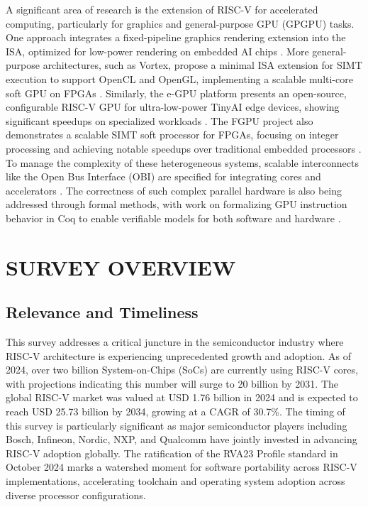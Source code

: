 \documentclass[a4paper,twoside]{article}
\begin{document}
A significant area of research is the extension of RISC-V for accelerated computing, particularly for graphics and general-purpose GPU (GPGPU) tasks. One approach integrates a fixed-pipeline graphics rendering extension into the ISA, optimized for low-power rendering on embedded AI chips \cite{Zhou2020}. More general-purpose architectures, such as Vortex, propose a minimal ISA extension for SIMT execution to support OpenCL and OpenGL, implementing a scalable multi-core soft GPU on FPGAs \cite{Tine2021, Elsabbagh2020}. Similarly, the e-GPU platform presents an open-source, configurable RISC-V GPU for ultra-low-power TinyAI edge devices, showing significant speedups on specialized workloads \cite{Machetti2025}. The FGPU project also demonstrates a scalable SIMT soft processor for FPGAs, focusing on integer processing and achieving notable speedups over traditional embedded processors \cite{AlKadi2016}. To manage the complexity of these heterogeneous systems, scalable interconnects like the Open Bus Interface (OBI) are specified for integrating cores and accelerators \cite{OpenHW2019}. The correctness of such complex parallel hardware is also being addressed through formal methods, with work on formalizing GPU instruction behavior in Coq to enable verifiable models for both software and hardware \cite{Bhatia2019}.

\section{\uppercase{Survey Overview}}

\subsection{Relevance and Timeliness}
This survey addresses a critical juncture in the semiconductor industry where RISC-V architecture is experiencing unprecedented growth and adoption. As of 2024, over two billion System-on-Chips (SoCs) are currently using RISC-V cores, with projections indicating this number will surge to 20 billion by 2031. The global RISC-V market was valued at USD 1.76 billion in 2024 and is expected to reach USD 25.73 billion by 2034, growing at a CAGR of 30.7\%. The timing of this survey is particularly significant as major semiconductor players including Bosch, Infineon, Nordic, NXP, and Qualcomm have jointly invested in advancing RISC-V adoption globally. The ratification of the RVA23 Profile standard in October 2024 marks a watershed moment for software portability across RISC-V implementations, accelerating toolchain and operating system adoption across diverse processor configurations.
\end{document}
